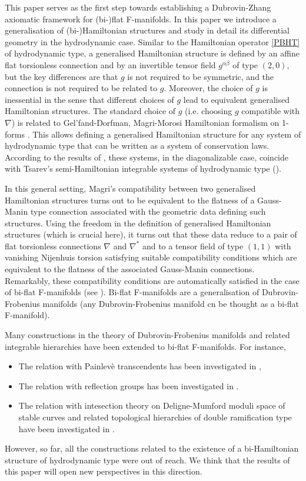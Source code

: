 \documentclass[11pt,a4paper]{amsart}
\numberwithin{equation}{section}
\newcommand{\qa}{\alpha}
\newcommand{\qb}{\beta}
\numberwithin{equation}{section}
\begin{document}
This paper serves as the first step towards establishing a Dubrovin-Zhang axiomatic framework for (bi-)flat F-manifolds. In this paper we introduce a generalisation of (bi-)Hamiltonian structures and study in detail its differential geometry in the hydrodynamic case. Similar to the Hamiltonian operator \eqref{PBHT} of hydrodynamic type, a generalised Hamiltonian structure is defined by an affine flat torsionless connection and by an invertible tensor field $g^{\qa\qb}$ of type $(2,0)$, but the key differences are that $g$ is not required to be symmetric, and the connection is not required to be related to $g$. Moreover, the choice of $g$ is inessential in the sense that different choices of $g$ lead to equivalent generalised Hamiltonian structures. The standard choice of $g$ (i.e. choosing $g$ compatible  with $\nabla$) is related to Gel'fand-Dorfman, Magri-Morosi Hamiltonian formalism on 1-forms \cite{AL12}. This allows defining a generalised Hamiltonian structure for any  system of hydrodynamic type that  can be written  as a system of  conservation laws. According to the results of \cite{Sevennec}, these systems, in the diagonalizable case,  coincide with Tsarev's semi-Hamiltonian integrable systems of hydrodynamic type (\cite{ts91}). 

In this general setting, Magri's compatibility between two generalised Hamiltonian structures turns out to be equivalent to the flatness of a Gauss-Manin type connection associated with the geometric data defining such structures. Using the freedom in the definition of generalised Hamiltonian structures (which is crucial here), it turns out that these data reduce to a pair of flat torsionless connections $\nabla$ and $\nabla^*$ and to a tensor field of type $(1,1)$ with vanishing Nijenhuis torsion satisfying suitable compatibility conditions which are equivalent to the flatness of the associated Gauss-Manin connections. Remarkably, these compatibility conditions are automatically satisfied in the case of bi-flat F-manifolds (see \cite{AL_GM}). Bi-flat F-manifolds are a generalisation of Dubrovin-Frobenius manifolds (any Dubrovin-Frobenius manifold cn be thought as a bi-flat F-manifold).

Many constructions in the theory of Dubrovin-Frobenius manifolds
 and related integrable hierarchies have been extended to bi-flat F-manifolds. For instance,
 \begin{itemize}
 \item The relation with Painlevè transcendents has been investigated in \cite{ALjgp,Limrn,KMS,ALmulti,KM},
 \item The relation with reflection groups has been investigated in \cite{KMS15,ALcomplex,KMS}.
 \item The relation with intesection theory on Deligne-Mumford moduli space of stable curves and related topological hierarchies of double ramification type have been investigated in \cite{ABLR1,ABLR2}. 
 \end{itemize}
However, so far, all the constructions related to the existence of a bi-Hamiltonian structure of hydrodynamic type were out of reach. We think that the results of this paper will open new perspectives in this direction. 
\end{document}
